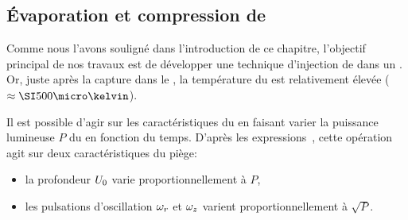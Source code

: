 \subsection{Évaporation et compression de \nats}\label{sec:EvapPD}

Comme nous l'avons souligné dans l'introduction de ce chapitre, l'objectif principal de nos travaux est de développer une technique d'injection de \patufs dans un \gm. Or, juste après la capture dans le \pd, la température du \nat est relativement élevée ($\approx \microK{500}$).

Il est possible d'agir sur les caractéristiques du \n en faisant varier la puissance lumineuse $P$ du \fld en fonction du temps. D'après les expressions~, cette opération agit sur deux caractéristiques du piège:
\begin{itemize}
	\item la profondeur ${{U_0}}$ varie proportionnellement à $P$,
	\item les pulsations d'oscillation ${\omega_{r}}$ et ${\omega_{z}}$ varient proportionnellement à $\sqrt{P}$.
\end{itemize}

